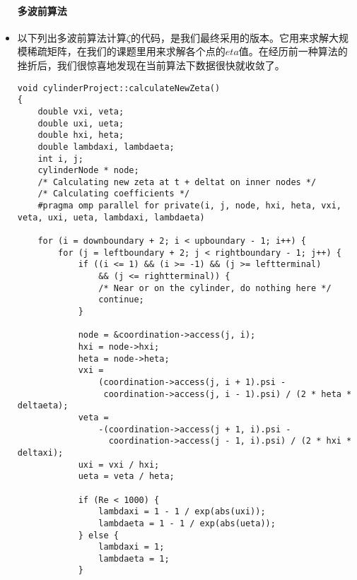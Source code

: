 \documentclass[12pt]{article}
\begin{document}
\begin{itemize}
\paragraph{多波前算法}
\item 以下列出多波前算法计算$\zeta$的代码，是我们最终采用的版本。它用来求解大规模稀疏矩阵，在我们的课题里用来求解各个点的$eta$值。在经历前一种算法的挫折后，我们很惊喜地发现在当前算法下数据很快就收敛了。
\begin{lstlisting}
void cylinderProject::calculateNewZeta()
{
    double vxi, veta;
    double uxi, ueta;
    double hxi, heta;
    double lambdaxi, lambdaeta;
    int i, j;
    cylinderNode * node;
    /* Calculating new zeta at t + deltat on inner nodes */
    /* Calculating coefficients */
    #pragma omp parallel for private(i, j, node, hxi, heta, vxi, veta, uxi, ueta, lambdaxi, lambdaeta)

    for (i = downboundary + 2; i < upboundary - 1; i++) {
        for (j = leftboundary + 2; j < rightboundary - 1; j++) {
            if ((i <= 1) && (i >= -1) && (j >= leftterminal)
                && (j <= rightterminal)) {
                /* Near or on the cylinder, do nothing here */
                continue;
            }

            node = &coordination->access(j, i);
            hxi = node->hxi;
            heta = node->heta;
            vxi =
                (coordination->access(j, i + 1).psi -
                 coordination->access(j, i - 1).psi) / (2 * heta * deltaeta);
            veta =
                -(coordination->access(j + 1, i).psi -
                  coordination->access(j - 1, i).psi) / (2 * hxi * deltaxi);
            uxi = vxi / hxi;
            ueta = veta / heta;

            if (Re < 1000) {
                lambdaxi = 1 - 1 / exp(abs(uxi));
                lambdaeta = 1 - 1 / exp(abs(ueta));
            } else {
                lambdaxi = 1;
                lambdaeta = 1;
            }


\end{lstlisting}
\end{itemize}
\end{document}
